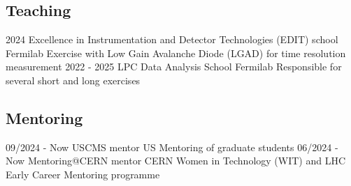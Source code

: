 \subsection{Teaching}
\position
      {2024} 
      {Excellence in Instrumentation and Detector Technologies (EDIT) school}
      {Fermilab}
      {Exercise with Low Gain Avalanche Diode (LGAD) for time resolution measurement}
	\position
      {2022 - 2025} 
      {LPC Data Analysis School}
      {Fermilab}
      {Responsible for several short and long exercises}
\subsection{Mentoring}
	\position
      {09/2024 - Now } 
      {USCMS mentor}
      {US}
      {Mentoring of graduate students}
	\position
      {06/2024 - Now } 
      {Mentoring@CERN mentor}
      {CERN}
      {Women in Technology (WIT) and LHC Early Career Mentoring programme}

